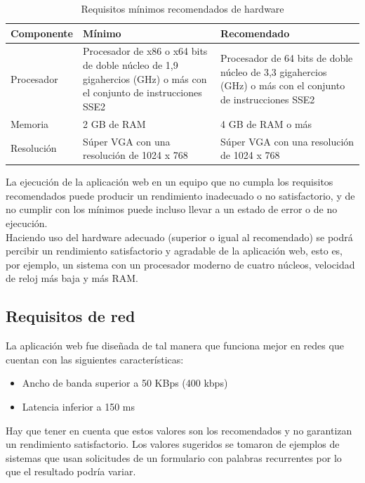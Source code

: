 \documentclass[12pt, a4paper, titlepage]{article}
\begin{document}
	\begin{table}[!htbp]
		\caption[Requisitos hardware]{Requisitos mínimos recomendados de hardware}
		\begin{tabular}{| M{4cm} | M{4cm} | M{4cm} |} 
			\hline
			\textbf{Componente} & \textbf{Mínimo} & \textbf{Recomendado} \\ 
			\hline
			Procesador & Procesador de x86 o x64 bits de doble núcleo de 1,9 gigahercios (GHz) o más con el conjunto de instrucciones SSE2 & Procesador de 64 bits de doble núcleo de 3,3 gigahercios (GHz) o más con el conjunto de instrucciones SSE2 \\ 
			\hline
			Memoria & 2 GB de RAM & 4 GB de RAM o más \\
			\hline
			Resolución  & Súper VGA con una resolución de 1024 x 768 & Súper VGA con una resolución de 1024 x 768 \\
			\hline
		\end{tabular}
	\end{table}
	
	La ejecución de la aplicación web en un equipo que no cumpla los requisitos recomendados puede producir un rendimiento inadecuado o no satisfactorio, y de no cumplir con los mínimos puede incluso llevar a un estado de error o de no ejecución.\\
	Haciendo uso del hardware adecuado (superior o igual al recomendado) se podrá percibir un rendimiento satisfactorio y agradable de la aplicación web, esto es, por ejemplo, un sistema con un procesador moderno de cuatro núcleos, velocidad de reloj más baja y más RAM.
	
	\subsection{Requisitos de red}
	La aplicación web fue diseñada de tal manera que funciona mejor en redes que cuentan con las siguientes características:
	
	\begin{itemize}
		\item Ancho de banda superior a 50 KBps (400 kbps)
		\item Latencia inferior a 150 ms
	\end{itemize}
	
	Hay que tener en cuenta que estos valores son los recomendados y no garantizan un rendimiento satisfactorio. Los valores sugeridos se tomaron de ejemplos de sistemas que usan solicitudes de un formulario con palabras recurrentes por lo que el resultado podría variar.
	
\end{document}
